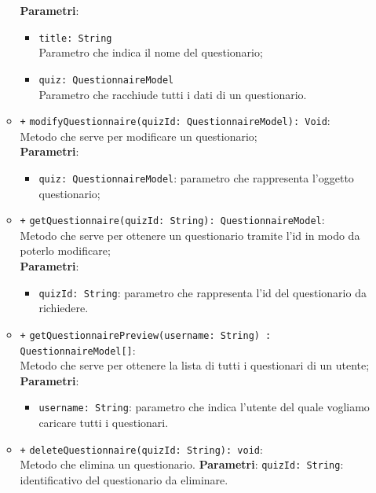 \begin{itemize}
\begin{itemize}
			\textbf{Parametri}:
			\begin{itemize}
				\item \texttt{title: String} \\ Parametro che indica il nome del questionario;
				\item \texttt{quiz: QuestionnaireModel} \\ Parametro che racchiude tutti i dati di un questionario.
			\end{itemize}
			\item \texttt{+} \texttt{modifyQuestionnaire(quizId: QuestionnaireModel): Void}: \\ Metodo che serve per modificare un questionario; \\
			\textbf{Parametri}:
			\begin{itemize}
				\item \texttt{quiz: QuestionnaireModel}: parametro che rappresenta l'oggetto questionario;
			\end{itemize}
			\item \texttt{+} \texttt{getQuestionnaire(quizId: String): QuestionnaireModel}: \\Metodo che serve per ottenere un questionario tramite l'id in modo da poterlo modificare; \\
			\textbf{Parametri}:
			\begin{itemize}
				\item \texttt{quizId: String}: parametro che rappresenta l'id del questionario da richiedere.
			\end{itemize}
			\item \texttt{+} \texttt{getQuestionnairePreview(username: String) : QuestionnaireModel[]}: \\ Metodo che serve per ottenere la lista di tutti i questionari di un utente; \\
			\textbf{Parametri}:
			\begin{itemize}
				\item \texttt{username: String}: parametro che indica l'utente del quale vogliamo caricare tutti i questionari.
			\end{itemize}
			\item \texttt{+} \texttt{deleteQuestionnaire(quizId: String): void}: \\Metodo che elimina un questionario.
			\textbf{Parametri}:
			\texttt{quizId: String}: identificativo del questionario da eliminare.
			

\end{itemize}
\end{itemize}
